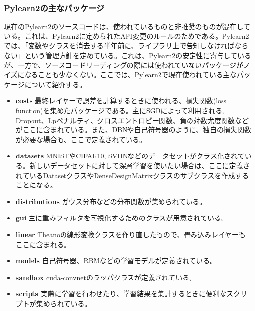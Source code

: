 \subsubsection{Pylearn2の主なパッケージ}
現在のPylearn2のソースコードは、使われているものと非推奨のものが混在している。これは、Pylearn2に定められたAPI変更のルールのためである。Pylearn2では、「変数やクラスを消去する半年前に、ライブラリ上で告知しなければならない」という管理方針を定めている。これは、Pylearn2の安定性に寄与しているが、一方で、ソースコードリーディングの際には使われていないパッケージがノイズになることも少なくない。ここでは、Pylearn2で現在使われている主なパッケージについて紹介する。
\begin{itemize}
\item \textbf{costs} 最終レイヤーで誤差を計算するときに使われる、損失関数(loss function)を集めたパッケージである。主にSGDによって利用される。Dropout、Lpペナルティ、クロスエントロピー関数、負の対数尤度関数などがここに含まれている。また、DBNや自己符号器のように、独自の損失関数が必要な場合も、ここで定義されている。
\item \textbf{datasets} MNISTやCIFAR10, SVHNなどのデータセットがクラス化されている。新しいデータセットに対して深層学習を使いたい場合は、ここに定義されているDatasetクラスやDenseDesignMatrixクラスのサブクラスを作成することになる。
\item \textbf{distributions} ガウス分布などの分布関数が集められている。
\item \textbf{gui} 主に重みフィルタを可視化するためのクラスが用意されている。
\item \textbf{linear} Theanoの線形変換クラスを作り直したもので、畳み込みレイヤーもここに含まれる。
\item \textbf{models} 自己符号器、RBMなどの学習モデルが定義されている。
\item \textbf{sandbox} cuda-convnetのラッパクラスが定義されている。
\item \textbf{scripts} 実際に学習を行わせたり、学習結果を集計するときに便利なスクリプトが集められている。


\end{itemize}

